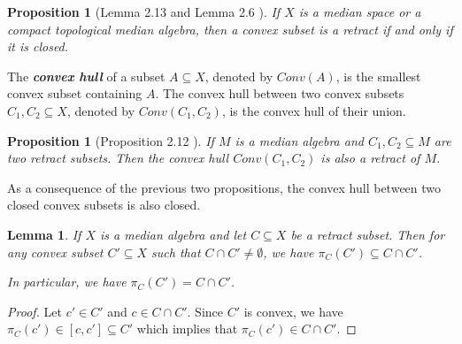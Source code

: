 \documentclass{amsart}
\numberwithin{equation}{section}
\newtheorem{lem}[thm]{Lemma}
\newtheorem{prop}[thm]{Proposition}
\newcommand{\hh}{\mathfrak{h}}    %
\theoremstyle{definition}
\begin{document}
\begin{prop}[Lemma 2.13 \cite{ChaDH_median} and Lemma 2.6 \cite{Fior_median_property}]
    If $X$ is a median space or a compact topological median algebra, then a convex subset is a retract if and only if it is closed.
\end{prop}
The \textbf{\textit{convex hull}} of a subset $A\subseteq X$, denoted by $Conv(A)$, is the smallest convex subset containing $A$. The convex hull between two convex subsets $C_1,C_2\subseteq X$, denoted by $Conv(C_1,C_2)$, is the convex hull of their union.
\begin{prop}[Proposition 2.12 \cite{Roller} ]\label{prop_convex_hull_retract}
    If $M$ is a median algebra and $C_1,C_2\subseteq M$ are two retract subsets. Then the convex hull $Conv(C_1,C_2)$ is also a retract of $M$.
\end{prop}
As a consequence of the previous two propositions, the convex hull between two closed convex subsets is also closed.


\begin{lem}\label{lem_projection_intersect_gate}
If $X$ is a median algebra and let $C\subseteq X$ be a retract subset. Then for any convex subset $C'\subseteq X$ such that $C\cap C'\neq \emptyset$, we have $\pi_C(C')\subseteq C\cap C'$.\par 
In particular, we have $\pi_C(C')=C\cap C'$.
\end{lem}
\begin{proof}
    Let $c'\in C' $ and $c\in C\cap C'$. Since $C'$ is convex, we have $\pi_C(c')\in [c,c']\subseteq C'$ which implies that $\pi_C(c')\in C\cap C'$.
\end{proof}


 





\end{document}
